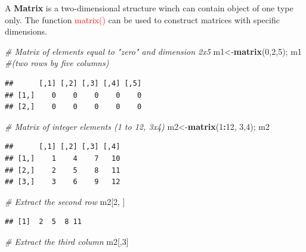 \documentclass[
]{book}
\newenvironment{Shaded}{\begin{snugshade}}{\end{snugshade}}
\newcommand{\CommentTok}[1]{\textcolor[rgb]{0.56,0.35,0.01}{\textit{#1}}}
\newcommand{\DecValTok}[1]{\textcolor[rgb]{0.00,0.00,0.81}{#1}}
\newcommand{\FunctionTok}[1]{\textcolor[rgb]{0.13,0.29,0.53}{\textbf{#1}}}
\newcommand{\NormalTok}[1]{#1}
\newcommand{\OtherTok}[1]{\textcolor[rgb]{0.56,0.35,0.01}{#1}}
\newcommand{\SpecialCharTok}[1]{\textcolor[rgb]{0.81,0.36,0.00}{\textbf{#1}}}
\begin{document}
A \textbf{Matrix} is a two-dimensional structure winch can contain object of one type only.
The function \textcolor{red}{matrix()} can be used to construct matrices with specific dimensions.

\begin{Shaded}
\begin{Highlighting}[]
\CommentTok{\# Matrix of elements equal to "zero" and dimension 2x5 }
\NormalTok{m1}\OtherTok{\textless{}{-}}\FunctionTok{matrix}\NormalTok{(}\DecValTok{0}\NormalTok{,}\DecValTok{2}\NormalTok{,}\DecValTok{5}\NormalTok{); m1  }\CommentTok{\#(two rows by five columns)}
\end{Highlighting}
\end{Shaded}

\begin{verbatim}
##      [,1] [,2] [,3] [,4] [,5]
## [1,]    0    0    0    0    0
## [2,]    0    0    0    0    0
\end{verbatim}

\begin{Shaded}
\begin{Highlighting}[]
\CommentTok{\# Matrix of integer elements (1 to 12, 3x4) }
\NormalTok{m2}\OtherTok{\textless{}{-}}\FunctionTok{matrix}\NormalTok{(}\DecValTok{1}\SpecialCharTok{:}\DecValTok{12}\NormalTok{, }\DecValTok{3}\NormalTok{,}\DecValTok{4}\NormalTok{); m2 }
\end{Highlighting}
\end{Shaded}

\begin{verbatim}
##      [,1] [,2] [,3] [,4]
## [1,]    1    4    7   10
## [2,]    2    5    8   11
## [3,]    3    6    9   12
\end{verbatim}

\begin{Shaded}
\begin{Highlighting}[]
\CommentTok{\# Extract the second row}
\NormalTok{m2[}\DecValTok{2}\NormalTok{, ]}
\end{Highlighting}
\end{Shaded}

\begin{verbatim}
## [1]  2  5  8 11
\end{verbatim}

\begin{Shaded}
\begin{Highlighting}[]
\CommentTok{\# Extract the third column}
\NormalTok{m2[,}\DecValTok{3}\NormalTok{]}
\end{Highlighting}
\end{Shaded}
\end{document}
